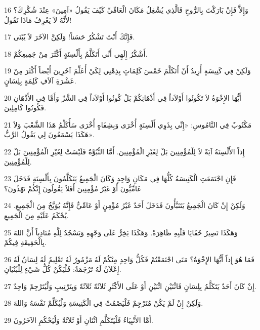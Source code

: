 \par 16 وَإِلاَّ فَإِنْ بَارَكْتَ بِالرُّوحِ فَالَّذِي يُشْغِلُ مَكَانَ الْعَامِّيِّ كَيْفَ يَقُولُ «آمِينَ» عِنْدَ شُكْرِكَ؟ لأَنَّهُ لاَ يَعْرِفُ مَاذَا تَقُولُ!
\par 17 فَإِنَّكَ أَنْتَ تَشْكُرُ حَسَناً! وَلَكِنَّ الآخَرَ لاَ يُبْنَى.
\par 18 أَشْكُرُ إِلَهِي أَنِّي أَتَكَلَّمُ بِأَلْسِنَةٍ أَكْثَرَ مِنْ جَمِيعِكُمْ.
\par 19 وَلَكِنْ فِي كَنِيسَةٍ أُرِيدُ أَنْ أَتَكَلَّمَ خَمْسَ كَلِمَاتٍ بِذِهْنِي لِكَيْ أُعَلِّمَ آخَرِينَ أَيْضاً أَكْثَرَ مِنْ عَشْرَةِ آلاَفِ كَلِمَةٍ بِلِسَانٍ.
\par 20 أَيُّهَا الإِخْوَةُ لاَ تَكُونُوا أَوْلاَداً فِي أَذْهَانِكُمْ بَلْ كُونُوا أَوْلاَداً فِي الشَّرِّ وَأَمَّا فِي الأَذْهَانِ فَكُونُوا كَامِلِينَ.
\par 21 مَكْتُوبٌ فِي النَّامُوسِ: «إِنِّي بِذَوِي أَلْسِنَةٍ أُخْرَى وَبِشِفَاهٍ أُخْرَى سَأُكَلِّمُ هَذَا الشَّعْبَ وَلاَ هَكَذَا يَسْمَعُونَ لِي يَقُولُ الرَّبُّ».
\par 22 إِذاً الأَلْسِنَةُ آيَةٌ لاَ لِلْمُؤْمِنِينَ بَلْ لِغَيْرِ الْمُؤْمِنِينَ. أَمَّا النُّبُوَّةُ فَلَيْسَتْ لِغَيْرِ الْمُؤْمِنِينَ بَلْ لِلْمُؤْمِنِينَ.
\par 23 فَإِنِ اجْتَمَعَتِ الْكَنِيسَةُ كُلُّهَا فِي مَكَانٍ وَاحِدٍ وَكَانَ الْجَمِيعُ يَتَكَلَّمُونَ بِأَلْسِنَةٍ فَدَخَلَ عَامِّيُّونَ أَوْ غَيْرُ مُؤْمِنِينَ أَفَلاَ يَقُولُونَ إِنَّكُمْ تَهْذُونَ؟
\par 24 وَلَكِنْ إِنْ كَانَ الْجَمِيعُ يَتَنَبَّأُونَ فَدَخَلَ أَحَدٌ غَيْرُ مُؤْمِنٍ أَوْ عَامِّيٌّ فَإِنَّهُ يُوَبَّخُ مِنَ الْجَمِيعِ. يُحْكَمُ عَلَيْهِ مِنَ الْجَمِيعِ.
\par 25 وَهَكَذَا تَصِيرُ خَفَايَا قَلْبِهِ ظَاهِرَةً. وَهَكَذَا يَخِرُّ عَلَى وَجْهِهِ وَيَسْجُدُ لِلَّهِ مُنَادِياً أَنَّ اللهَ بِالْحَقِيقَةِ فِيكُمْ.
\par 26 فَمَا هُوَ إِذاً أَيُّهَا الإِخْوَةُ؟ مَتَى اجْتَمَعْتُمْ فَكُلُّ وَاحِدٍ مِنْكُمْ لَهُ مَزْمُورٌ لَهُ تَعْلِيمٌ لَهُ لِسَانٌ لَهُ إِعْلاَنٌ لَهُ تَرْجَمَةٌ: فَلْيَكُنْ كُلُّ شَيْءٍ لِلْبُنْيَانِ.
\par 27 إِنْ كَانَ أَحَدٌ يَتَكَلَّمُ بِلِسَانٍ فَاثْنَيْنِ اثْنَيْنِ أَوْ عَلَى الأَكْثَرِ ثَلاَثَةً ثَلاَثَةً وَبِتَرْتِيبٍ وَلْيُتَرْجِمْ وَاحِدٌ.
\par 28 وَلَكِنْ إِنْ لَمْ يَكُنْ مُتَرْجِمٌ فَلْيَصْمُتْ فِي الْكَنِيسَةِ وَلْيُكَلِّمْ نَفْسَهُ وَاللهَ.
\par 29 أَمَّا الأَنْبِيَاءُ فَلْيَتَكَلَّمِ اثْنَانِ أَوْ ثَلاَثَةٌ وَلْيَحْكُمِ الآخَرُونَ.
